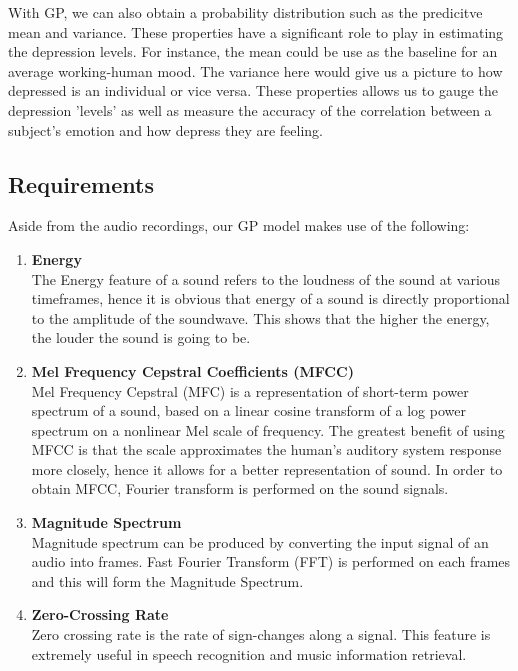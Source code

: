 \documentclass{article}
\begin{document}
	With GP, we can also obtain a probability distribution such as the predicitve mean and variance. 
	These properties have a significant role to play in estimating the depression levels. For instance, the mean could be use as the baseline for an average working-human mood. 
	The variance here would give us a picture to how depressed is an individual or vice versa.
	These properties allows us to gauge the depression 'levels' as well as measure the accuracy of the correlation between a subject's emotion and how depress they are feeling.

	\subsection{Requirements}
	Aside from the audio recordings, our GP model makes use of the following:
	\begin{enumerate}
		\item \textbf{Energy}	\\
		The Energy feature of a sound refers to the loudness of the sound at various timeframes, 
		hence it is obvious that energy of a sound is directly proportional to the amplitude of the soundwave. 
		This shows that the higher the energy, the louder the sound is going to be.	
	
		\item \textbf{Mel Frequency Cepstral Coefficients (MFCC)} \\
		Mel Frequency Cepstral (MFC) is a representation of short-term power spectrum of a sound, 
		based on a linear cosine transform of a log power spectrum on a nonlinear Mel scale of frequency. 
		The greatest benefit of using MFCC is that the scale approximates the 
		human's auditory system response more closely, hence it allows for a better representation of sound. 
		In order to obtain MFCC, Fourier transform is performed on the sound signals.	
	
		\item \textbf{Magnitude Spectrum} \\
		Magnitude spectrum can be produced by converting the input signal of an audio into frames. 
		Fast Fourier Transform (FFT) is performed on each frames and this will form the Magnitude Spectrum.
		
		\item \textbf{Zero-Crossing Rate} \\
		Zero crossing rate is the rate of sign-changes along a signal. This feature is extremely useful in speech recognition and music information retrieval.
	\end{enumerate}
\end{document}
